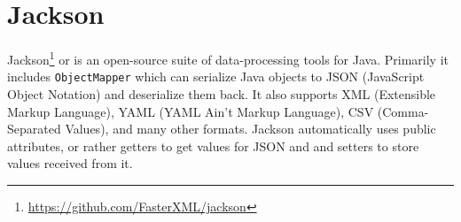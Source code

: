 \section{Jackson} \label{sec:jackson}
Jackson\footnote{\url{https://github.com/FasterXML/jackson}} or  is an open-source suite of data-processing tools for Java. Primarily it includes \texttt{ObjectMapper} which can serialize Java objects to JSON (JavaScript Object Notation) and deserialize them back.
It also supports XML (Extensible Markup Language), YAML (YAML Ain't Markup Language), CSV (Comma-Separated Values), and many other formats.
Jackson automatically uses public attributes, or rather getters to get values for JSON and and setters to store values received from it.
